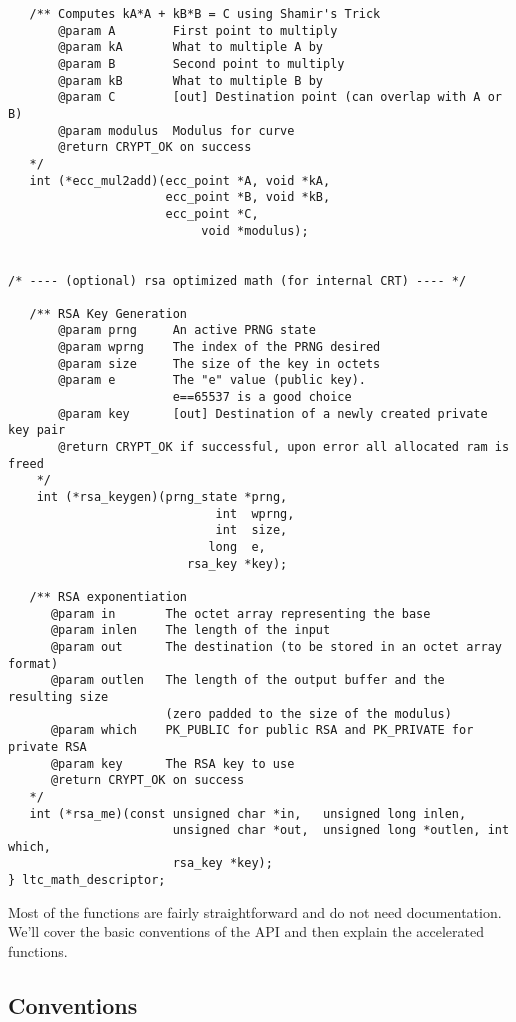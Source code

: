 \documentclass[synpaper]{book}
\begin{document}
\begin{small}
\begin{verbatim}
   /** Computes kA*A + kB*B = C using Shamir's Trick
       @param A        First point to multiply
       @param kA       What to multiple A by
       @param B        Second point to multiply
       @param kB       What to multiple B by
       @param C        [out] Destination point (can overlap with A or B)
       @param modulus  Modulus for curve
       @return CRYPT_OK on success
   */
   int (*ecc_mul2add)(ecc_point *A, void *kA,
                      ecc_point *B, void *kB,
                      ecc_point *C,
                           void *modulus);


/* ---- (optional) rsa optimized math (for internal CRT) ---- */

   /** RSA Key Generation
       @param prng     An active PRNG state
       @param wprng    The index of the PRNG desired
       @param size     The size of the key in octets
       @param e        The "e" value (public key).
                       e==65537 is a good choice
       @param key      [out] Destination of a newly created private key pair
       @return CRYPT_OK if successful, upon error all allocated ram is freed
    */
    int (*rsa_keygen)(prng_state *prng,
                             int  wprng,
                             int  size,
                            long  e,
                         rsa_key *key);

   /** RSA exponentiation
      @param in       The octet array representing the base
      @param inlen    The length of the input
      @param out      The destination (to be stored in an octet array format)
      @param outlen   The length of the output buffer and the resulting size
                      (zero padded to the size of the modulus)
      @param which    PK_PUBLIC for public RSA and PK_PRIVATE for private RSA
      @param key      The RSA key to use
      @return CRYPT_OK on success
   */
   int (*rsa_me)(const unsigned char *in,   unsigned long inlen,
                       unsigned char *out,  unsigned long *outlen, int which,
                       rsa_key *key);
} ltc_math_descriptor;
\end{verbatim}
\end{small}

Most of the functions are fairly straightforward and do not need documentation.  We'll cover the basic conventions of the API and then explain the accelerated functions.

\subsection{Conventions}
\end{document}
